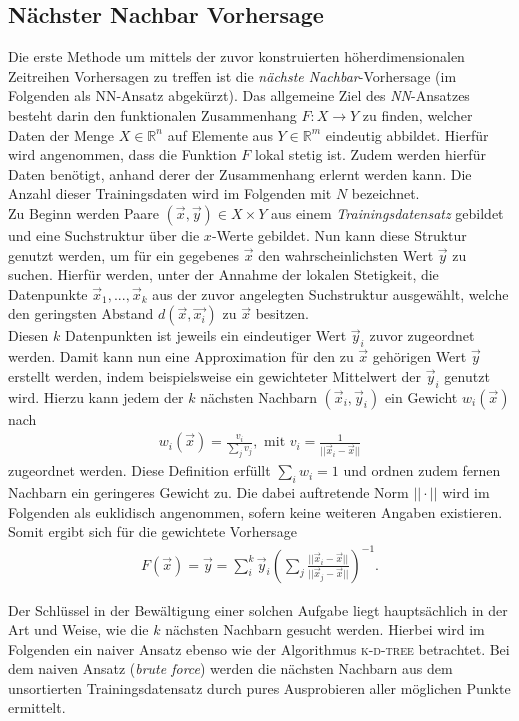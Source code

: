 \subsection{Nächster Nachbar Vorhersage}
\label{sc:theory_nn}
Die erste Methode um mittels der zuvor konstruierten höherdimensionalen Zeitreihen Vorhersagen zu treffen ist die \textit{nächste Nachbar}-Vorhersage (im Folgenden als \textsc{NN}-Ansatz abgekürzt). Das allgemeine Ziel des \textit{NN}-Ansatzes besteht darin den funktionalen Zusammenhang $F : X \rightarrow Y$ zu finden, welcher Daten der Menge $X \in \mathbb{R}^n$ auf Elemente aus $Y \in \mathbb{R}^m$ eindeutig abbildet. Hierfür wird angenommen, dass die Funktion $F$ lokal stetig ist. Zudem werden hierfür Daten benötigt, anhand derer der Zusammenhang erlernt werden kann. Die Anzahl dieser Trainingsdaten wird im Folgenden mit $N$ bezeichnet.\\
Zu Beginn werden Paare $(\vec{x},\vec{y}) \in X \times Y$ aus einem \textit{Trainingsdatensatz} gebildet und eine Suchstruktur über die $x$-Werte gebildet. Nun kann diese Struktur genutzt werden, um für ein gegebenes $\vec{x}$ den wahrscheinlichsten Wert $\vec{y}$ zu suchen. Hierfür werden, unter der Annahme der lokalen Stetigkeit, die Datenpunkte $\vec{x}_1, ..., \vec{x}_k$ aus der zuvor angelegten Suchstruktur ausgewählt, welche den geringsten Abstand $d(\vec{x}, \vec{x_i})$ zu $\vec{x}$ besitzen.\\
Diesen $k$ Datenpunkten ist jeweils ein eindeutiger Wert $\vec{y}_i$ zuvor zugeordnet werden. Damit kann nun eine Approximation für den zu $\vec{x}$ gehörigen Wert $\vec{y}$ erstellt werden, indem beispielsweise ein gewichteter Mittelwert der $\vec{y}_i$ genutzt wird. Hierzu kann jedem der $k$ nächsten Nachbarn $(\vec{x}_i, \vec{y}_i)$ ein Gewicht $w_i(\vec{x})$ nach
\begin{align*}
w_i(\vec{x}) = \frac{v_i}{\sum_j v_j}, \text{ mit } v_i = \frac{1}{||\vec{x}_i-\vec{x}||} 
\end{align*}
zugeordnet werden. Diese Definition erfüllt $\sum_i w_i = 1$ und ordnen zudem fernen Nachbarn ein geringeres Gewicht zu. Die dabei auftretende Norm $||\cdot ||$ wird im Folgenden als euklidisch angenommen, sofern keine weiteren Angaben existieren. Somit ergibt sich für die gewichtete Vorhersage
\begin{align}
F(\vec{x}) = \vec{y} = \sum^k_i \vec{y}_i \left( \sum_j \frac{||\vec{x}_i-\vec{x}||}{||\vec{x}_j-\vec{x}||} \right) ^{-1}.
\end{align}

Der Schlüssel in der Bewältigung einer solchen Aufgabe liegt hauptsächlich in der Art und Weise, wie die $k$ nächsten Nachbarn gesucht werden. Hierbei wird im Folgenden ein naiver Ansatz ebenso wie der Algorithmus \textsc{k-d-tree} betrachtet. Bei dem naiven Ansatz (\textit{brute force}) werden die nächsten Nachbarn aus dem unsortierten Trainingsdatensatz durch pures Ausprobieren aller möglichen Punkte ermittelt.

